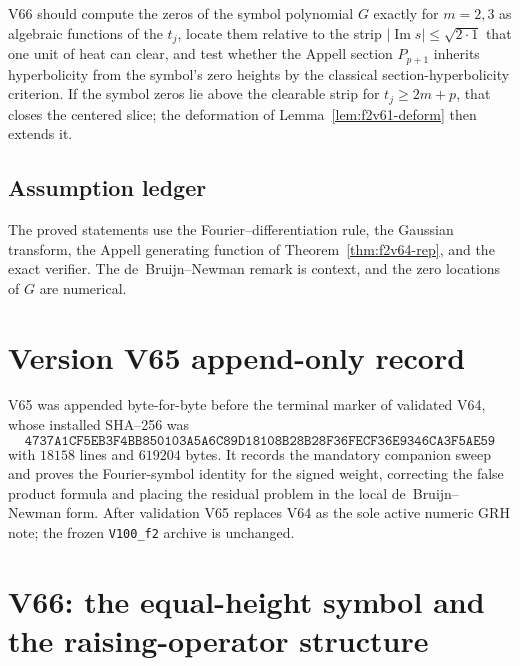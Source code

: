 \documentclass[11pt]{article}
\theoremstyle{definition}
\theoremstyle{remark}
\begin{document}
V66 should compute the zeros of the symbol polynomial \(G\) exactly for
\(m=2,3\) as algebraic functions of the \(t_j\), locate them relative to
the strip \(|\operatorname{Im}s|\le\sqrt{2\cdot 1}\) that one unit of
heat can clear, and test whether the Appell section \(P_{p+1}\) inherits
hyperbolicity from the symbol's zero heights by the classical
section-hyperbolicity criterion.  If the symbol zeros lie above the
clearable strip for \(t_j\ge2m+p\), that closes the centered slice; the
deformation of Lemma~\ref{lem:f2v61-deform} then extends it.

\subsection*{Assumption ledger}
\label{ass:f2v65}
The proved statements use the Fourier--differentiation rule, the Gaussian
transform, the Appell generating function of
Theorem~\ref{thm:f2v64-rep}, and the exact verifier.  The de~Bruijn--Newman
remark is context, and the zero locations of \(G\) are numerical.
\endgroup

\section*{Version V65 append-only record}

V65 was appended byte-for-byte before the terminal marker of validated
V64, whose installed SHA--256 was
\[
 \texttt{4737A1CF5EB3F4BB850103A5A6C89D18}
 \allowbreak\texttt{108B28B28F36FECF36E9346CA3F5AE59}
\]
with \(18158\) lines and \(619204\) bytes.  It records the mandatory
companion sweep and proves the Fourier-symbol identity for the signed
weight, correcting the false product formula and placing the residual
problem in the local de~Bruijn--Newman form.  After validation V65
replaces V64 as the sole active numeric GRH note; the frozen
\texttt{V100\_f2} archive is unchanged.





\clearpage
\section{V66: the equal-height symbol and the raising-operator structure}
\label{sec:f2v66-equal-height}
\begingroup
\setcounter{equation}{0}
\renewcommand{\theequation}{N66.\arabic{equation}}
\renewcommand{\theHequation}{f2v66.\arabic{equation}}
\end{document}
